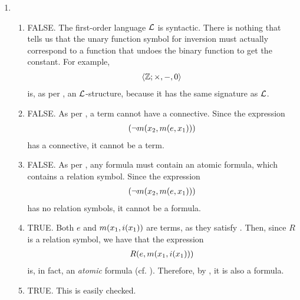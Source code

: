 \begin{solution}\hfill
    \begin{enumerate}
        \item %
        \begin{enumerate}
            \item FALSE. The first-order language $\mathcal{L}$ is syntactic. There is nothing that tells us that the unary function symbol for inversion must actually correspond to a function that undoes the binary function to get the constant. For example,
            \begin{align*}
                \left\langle \mathbb{Z}; \times, -, 0 \right\rangle
            \end{align*}
            is, as per , an $\mathcal{L}$-structure, because it has the same signature as $\mathcal{L}$.

            \item FALSE. As per , a term cannot have a connective. Since the expression
            \begin{align*}
                \left( \neg m\!\left( x_2, m\!\left( e, x_1 \right) \right) \right)
            \end{align*}
            has a connective, it cannot be a term.

            \item FALSE. As per , any formula must contain an atomic formula, which contains a relation symbol. Since the expression
            \begin{align*}
                \left( \neg m\!\left( x_2, m\!\left( e, x_1 \right) \right) \right)
            \end{align*}
            has no relation symbols, it cannot be a formula.

            \item TRUE. Both $e$ and $m\!\left( x_1, i\!\left( x_1 \right) \right)$ are terms, as they satisfy . Then, since $R$ is a relation symbol, we have that the expression
            \begin{align*}
                R\!\left( e, m\!\left( x_1, i\!\left( x_1 \right) \right) \right)
            \end{align*}
            is, in fact, an \textit{atomic} formula (cf. ). Therefore, by , it is also a formula.

            \item TRUE. This is easily checked.


\end{enumerate}
\end{enumerate}
\end{solution}
